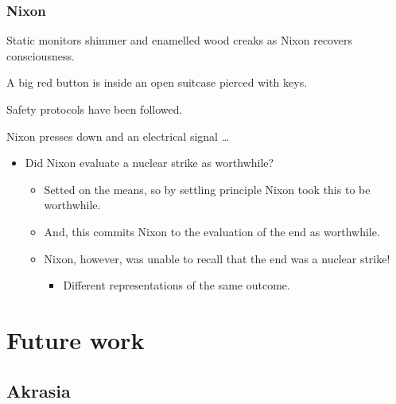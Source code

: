\documentclass[noamssymb, compress, handout]{beamer} %
\newcommand{\hozlinedash}[0]{%
  \noindent\hdashrule[0.5ex][c]{\textwidth}{.1pt}{2.5pt}
}
\begin{document}
 \begin{frame}
  \frametitle{Nixon}

  {\rmfamily
    Static monitors shimmer and enamelled wood creaks as Nixon recovers consciousness.

    A big red button is inside an open suitcase pierced with keys.

    Safety protocols have been followed.

    Nixon presses down and an electrical signal \dots
  }

  \pause
  \hozlinedash

  \begin{itemize}
  \item<+-> Did Nixon evaluate a nuclear strike as worthwhile?
    \begin{itemize}
    \item<+-> Setted on the means, so by settling principle Nixon took this to be worthwhile.
    \item<+-> And, this commits Nixon to the evaluation of the end as worthwhile.
    \item<+-> Nixon, however, was unable to recall that the end was a nuclear strike!
      \begin{itemize}
      \item<+-> Different representations of the same outcome.
      \end{itemize}
    \end{itemize}
  \end{itemize}
\end{frame}



\section{Future work}
\label{sec:future-work}


\subsection{Akrasia}
\label{sec:akrasia}
\end{document}
